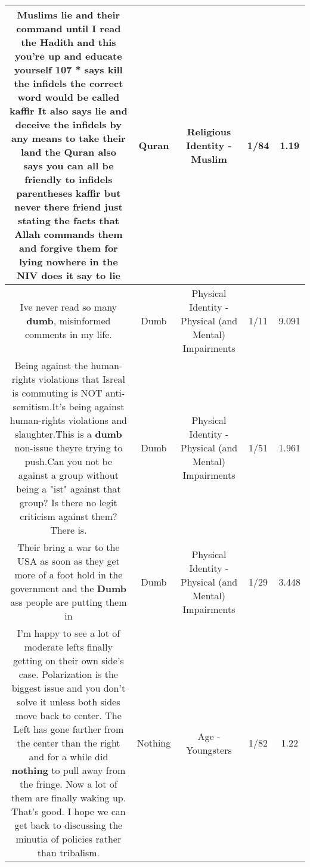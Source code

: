 \documentclass[11pt]{article}
\newlength\mylength
\begin{document}
\begin{center}
\begin{longtable}{|C{.65\mylength}|C{.30\mylength}|C{.12\mylength}|C{.12\mylength}|C{.12\mylength}|}
  \small Muslims lie and their command until I read the Hadith and this you're up and educate yourself 107 * says kill the infidels the correct word would be called kaffir It also says lie and deceive the infidels by any means to take their land the \textbf{Quran} also says you can all be friendly to infidels parentheses kaffir but never there friend just stating the facts that Allah commands them and forgive them for lying nowhere in the NIV does it say to lie\normalsize   & Quran & Religious Identity - Muslim & 1/84 & 1.19 \\  \hline
  \small Ive never read so many \textbf{dumb}, misinformed comments in my life.\normalsize   & Dumb & Physical Identity - Physical (and Mental) Impairments & 1/11 & 9.091 \\  \hline
  \small Being against the human-rights violations that Isreal is commuting is NOT anti-semitism.It's being against human-rights violations and slaughter.This is a \textbf{dumb} non-issue theyre trying to push.Can you not be against a group without being a "ist" against that group? Is there no legit criticism against them? There is.\normalsize   & Dumb & Physical Identity - Physical (and Mental) Impairments & 1/51 & 1.961 \\  \hline
  \small Their bring a war to the USA as soon as they get more of a foot hold in the government and the \textbf{Dumb} ass people are putting them in\normalsize   & Dumb & Physical Identity - Physical (and Mental) Impairments & 1/29 & 3.448 \\  \hline
  \small I'm happy to see a lot of moderate lefts finally getting on their own side's case. Polarization is the biggest issue and you don't solve it unless both sides move back to center. The Left has gone farther from the center than the right and for a while did \textbf{nothing} to pull away from the fringe. Now a lot of them are finally waking up. That's good. I hope we can get back to discussing the minutia of policies rather than tribalism.\normalsize   & Nothing & Age - Youngsters & 1/82 & 1.22 \\  \hline

\end{longtable}
\end{center}
\end{document}
